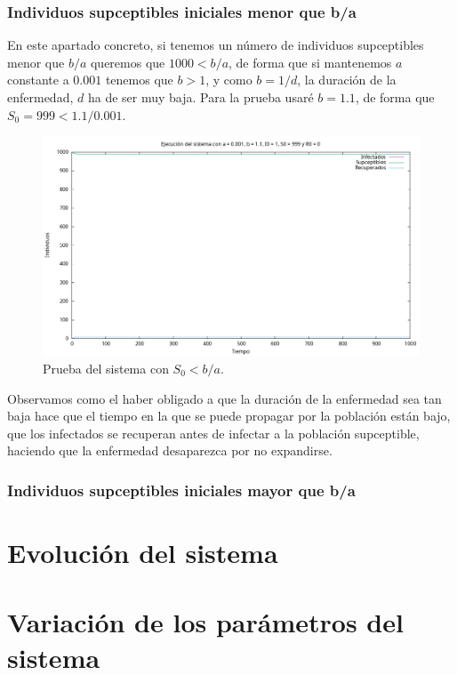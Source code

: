 \documentclass[12pt, spanish]{article}
\begin{document}
\subsubsection{Individuos supceptibles iniciales menor que b/a}

En este apartado concreto, si tenemos un número de individuos supceptibles menor que $b/a$ queremos que $1000 < b/a$, de forma que si mantenemos $a$ constante a $0.001$ tenemos que $b > 1$, y como $b = 1/d$, la duración de la enfermedad, $d$ ha de ser muy baja. Para la prueba usaré $b = 1.1$, de forma que $S_0 = 999 < 1.1/0.001$.

\begin{figure}[H]
  \centering
      \includegraphics[width=\textwidth]{SIR_s0_menor.png}
 		\caption{Prueba del sistema con $S_0 < b/a$.}
\end{figure}

Observamos como el haber obligado a que la duración de la enfermedad sea tan baja hace que el tiempo en la que se puede propagar por la población están bajo, que los infectados se recuperan antes de infectar a la población supceptible, haciendo que la enfermedad desaparezca por no expandirse.

\subsubsection{Individuos supceptibles iniciales mayor que b/a}



\section{Evolución del sistema}


\section{Variación de los parámetros del sistema}
\end{document}
